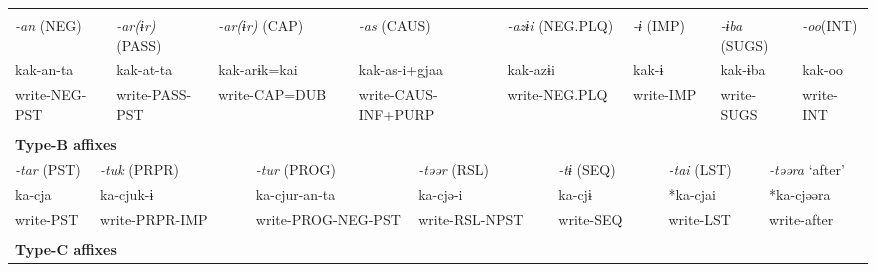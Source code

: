 \tabletail{}
\tablelasttail{}
\begin{tabularx}{\textwidth}{XXXXXXm{}XXXXXXXXXXXXXXXX}
\lsptoprule
\multicolumn{23}{X}{{\bfseries Type-A affixes}}\\
\multicolumn{3}{X}{{ \textit{{}-an} (NEG)}} & \multicolumn{4}{X}{{ \textit{{}-ar(ɨr)} (PASS)}} & \multicolumn{3}{X}{{ \textit{{}-ar(ɨr)} (CAP)}} & \multicolumn{5}{X}{{ \textit{{}-as} (CAUS)}} & \multicolumn{3}{X}{{ \textit{{}-azɨi} (NEG.PLQ)}} & \multicolumn{2}{X}{{ \textit{{}-ɨ} (IMP)}} & \multicolumn{2}{X}{{ \textit{{}-ɨba} (SUGS)}} & { \textit{{}-oo}(INT)}\\
\multicolumn{3}{X}{{ kak-an-ta}} & \multicolumn{4}{X}{{ kak-at-ta}} & \multicolumn{3}{X}{{ kak-arɨk=kai}} & \multicolumn{5}{X}{{ kak-as-i+gjaa}} & \multicolumn{3}{X}{{ kak-azɨi}} & \multicolumn{2}{X}{{ kak-ɨ}} & \multicolumn{2}{X}{{ kak-ɨba}} & { kak-oo}\\
\multicolumn{3}{X}{write-NEG-PST} & \multicolumn{4}{X}{write-PASS-PST} & \multicolumn{3}{X}{write-CAP=DUB} & \multicolumn{5}{X}{write-CAUS-INF+PURP} & \multicolumn{3}{X}{write-NEG.PLQ} & \multicolumn{2}{X}{write-IMP} & \multicolumn{2}{X}{write-SUGS} & write-INT\\
\multicolumn{23}{X}{}\\
\multicolumn{23}{X}{{\bfseries Type-B affixes}}\\
\multicolumn{2}{X}{{ \textit{{}-tar} (PST)}} & \multicolumn{6}{X}{{ \textit{{}-tuk} (PRPR)}} & \multicolumn{4}{X}{{ \textit{{}-tur} (PROG)}} & \multicolumn{4}{X}{{ \textit{{}-təər} (RSL)}} & \multicolumn{3}{X}{{ \textit{{}-tɨ} (SEQ)}} & \multicolumn{2}{X}{{ \textit{{}-tai} (LST)}} & \multicolumn{2}{X}{{ \textit{{}-təəra} ‘after’}}\\
\multicolumn{2}{X}{{ ka-cja}} & \multicolumn{6}{X}{{ ka-cjuk-ɨ}} & \multicolumn{4}{X}{{ ka-cjur-an-ta}} & \multicolumn{4}{X}{{ ka-cjə-i}} & \multicolumn{3}{X}{{ ka-cjɨ}} & \multicolumn{2}{X}{{ *ka-cjai}} & \multicolumn{2}{X}{{ *ka-cjəəra}}\\
\multicolumn{2}{X}{write-PST} & \multicolumn{6}{X}{write-PRPR-IMP} & \multicolumn{4}{X}{write-PROG-NEG-PST} & \multicolumn{4}{X}{write-RSL-NPST} & \multicolumn{3}{X}{write-SEQ} & \multicolumn{2}{X}{write-LST} & \multicolumn{2}{X}{{ write-after}}\\
\multicolumn{2}{X}{} & \multicolumn{6}{X}{} & \multicolumn{4}{X}{} & \multicolumn{4}{X}{} & \multicolumn{3}{X}{} & \multicolumn{2}{X}{} & \multicolumn{2}{X}{}\\
\multicolumn{23}{X}{{\bfseries Type-C affixes}}\\

\end{tabularx}
